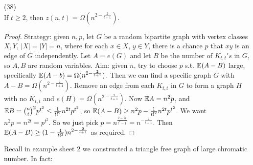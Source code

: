 \documentclass[a4paper]{article}
\begin{document}
\begin{thm} (38)\\
If $t \geq 2$, then $z(n,t) = \Omega (n^{2-\frac{2}{t+1}})$.
\begin{proof}
Strategy: given $n,p$, let $G$ be a random bipartite graph with vertex classes $X,Y$, $|X| = |Y| = n$, where for each $x \in X$, $y \in Y$, there is a chance $p$ that $xy$ is an edge of $G$ independently. Let $A = e(G)$ and let $B$ be the number of $K_{t,t}'s$ in $G$, so $A,B$ are random variables. Aim: given $n$, try to choose $p$ s.t. $\mathbb{E}(A-B)$ large, specifically $\mathbb{E}(A-b) = \Omega (n^{2-\frac{2}{t+1}})$. Then we can find a specific graph $G$ with $A-B = \Omega(n^{2-\frac{2}{t+1}})$. Remove an edge from each $K_{t,t}$ in $G$ to form a graph $H$ with no $K_{t,t}$ and $e(H) = \Omega(n^{2-\frac{2}{t+1}})$. Now $\mathbb{E} A = n^2 p$, and $\mathbb{E} B = {n \choose t}^2 p^{t^2} \leq \frac{1}{t!^2}n^{2t} p^{t^2}$, so $\mathbb{E}(A-B) \geq n^2p - \frac{1}{t!^2}n^{2t} p^{t^2}$. We want $n^2 p = n^{2t} = p^{t^2}$. So we just pick $p = n^{\frac{2-2t}{t^2-1}} = n^{-\frac{2}{t+1}}$. Then $\mathbb{E}(A-B) \geq (1-\frac{1}{t!^2}) n^{2-\frac{2}{t+1}}$ as required.
\end{proof}
\end{thm}

Recall in example sheet 2 we constructed a triangle free graph of large chromatic number. In fact:
\end{document}
